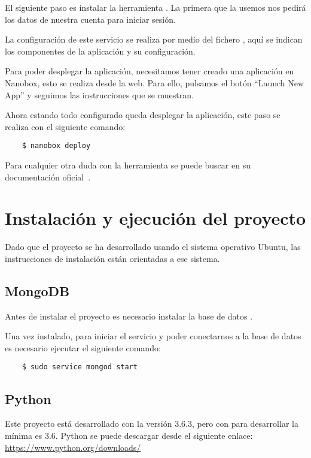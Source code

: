 El siguiente paso es instalar la herramienta 
. La primera que la 
usemos nos pedirá los datos de nuestra cuenta para iniciar sesión.

La configuración de este servicio se realiza por medio del fichero 
, aquí se indican los componentes de la aplicación y su 
configuración.

Para poder desplegar la aplicación, necesitamos tener creado una aplicación en 
Nanobox, esto se realiza desde la web. Para ello, pulsamos el botón ``Launch 
New App'' y seguimos las instrucciones que se muestran.

Ahora estando todo configurado queda desplegar la aplicación, este paso se 
realiza con el siguiente comando:
\begin{lstlisting}
	$ nanobox deploy
\end{lstlisting}

Para cualquier otra duda con la herramienta se puede buscar en su documentación 
oficial~\cite{doc:nanobox}.

\section{Instalación y ejecución del proyecto}\label{sec:instalacion}

Dado que el proyecto se ha desarrollado usando el sistema operativo Ubuntu, las 
instrucciones de instalación están orientadas a ese sistema.

\subsection{MongoDB}

Antes de instalar el proyecto es necesario instalar la base de datos 
.

Una vez instalado, para iniciar el servicio y poder conectarnos a la base de 
datos es necesario ejecutar el siguiente comando:
\begin{lstlisting}
	$ sudo service mongod start
\end{lstlisting}

\subsection{Python}

Este proyecto está desarrollado con la versión 3.6.3, pero con para desarrollar 
la mínima es 3.6. Python se puede descargar desde el siguiente enlace: 
\url{https://www.python.org/downloads/}

